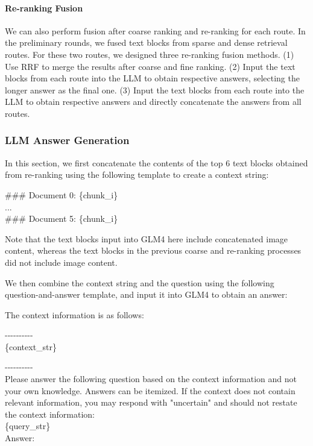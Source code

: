 \documentclass[11pt]{article}
\begin{document}
\paragraph{Re-ranking Fusion} We can also perform fusion after coarse ranking and re-ranking for each route. In the preliminary rounds, we fused text blocks from sparse and dense retrieval routes. For these two routes, we designed three re-ranking fusion methods. (1) Use RRF to merge the results after coarse and fine ranking.\label{item:fusion0} (2) Input the text blocks from each route into the LLM to obtain respective answers, selecting the longer answer as the final one.\label{item:fusion1} (3) Input the text blocks from each route into the LLM to obtain respective answers and directly concatenate the answers from all routes.\label{item:fusion2}

\subsubsection{LLM Answer Generation}\label{sec:generate}
In this section, we first concatenate the contents of the top 6 text blocks obtained from re-ranking using the following template to create a context string:
\begin{tcolorbox}
    \#\#\# Document 0: \{{\color{blue}chunk\_i}\}\\
    ...\\
    \#\#\# Document 5: \{{\color{blue}chunk\_i}\}\\
\end{tcolorbox}
Note that the text blocks input into GLM4 here include concatenated image content, whereas the text blocks in the previous coarse and re-ranking processes did not include image content.

We then combine the context string and the question using the following question-and-answer template, and input it into GLM4 to obtain an answer:
\begin{tcolorbox}
The context information is as follows:

-\--\--\--\--\--\--\--\--\--\\

\{{\color{blue}context\_str}\}

-\--\--\--\--\--\--\--\--\--\\

Please answer the following question based on the context information and not your own knowledge. Answers can be itemized. If the context does not contain relevant information, you may respond with "uncertain" and should not restate the context information:\\

\{{\color{blue}query\_str}\}\\

Answer:
\end{tcolorbox}
\end{document}
